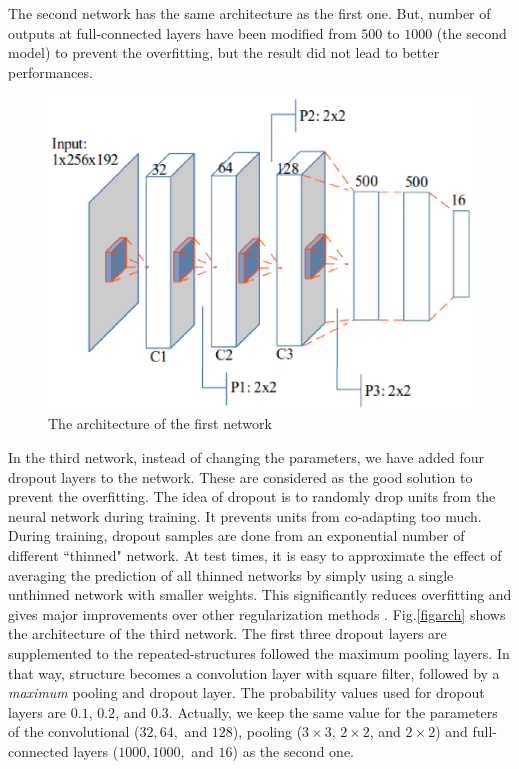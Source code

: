 \documentclass[conference]{IEEEtran}
\begin{document}
The second network has the same architecture as the first one. But, number of outputs at full-connected layers have been modified from $500$ to $1000$ (the second model) to prevent the overfitting, but the result did not lead to better performances. 

\begin{figure}[htbp]
	\centerline{\includegraphics[scale=0.45]{images/architecture1.eps}}
	\caption{The architecture of the first network}
	\label{figarch0}
\end{figure}

In the third network, instead of changing the parameters, we have added four dropout layers to the network. These are considered as the good solution to prevent the overfitting. The idea of dropout is to randomly drop units from the neural network during training. It prevents units from co-adapting too much. During training, dropout samples are done from an exponential number of different ``thinned" network. At test times, it is easy to approximate the effect of averaging the prediction of all thinned networks by simply using a single unthinned network with smaller weights. This significantly reduces overfitting and gives major improvements over other regularization methods \cite{srivastava2014dropout}. Fig.\ref{figarch} shows the architecture of the third network. The first three dropout layers are supplemented to the repeated-structures followed the maximum pooling layers. In that way, structure becomes a convolution layer with square filter, followed by a \textit{maximum} pooling and dropout layer. The probability values used for dropout layers are $0.1$, $0.2$, and $0.3$. Actually, we keep the same value for the parameters of the convolutional ($32, 64,$ and $128$), pooling ($3 \times 3$, $2 \times 2$, and $2 \times 2$) and full-connected layers ($1000, 1000,$ and $16$) as the second one.
\end{document}
